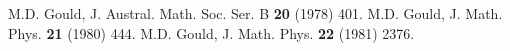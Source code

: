 \documentclass[12pt]{article}
\begin{document}
\begin{thebibliography}{10}
% 
% 
% 
% 
% 
% 
% 
 M.D. Gould, J. Austral. Math. Soc. Ser. B {\bf 20}  (1978) 401.
% 
 M.D. Gould, J. Math. Phys. {\bf 21} (1980) 444.
% 
% 
 M.D. Gould, J. Math. Phys. {\bf 22} (1981) 2376.
% 
% 
% 
% 
% 
% 
% 
% 
% 
% 
% 
% 
% 

\end{thebibliography}
\end{document}
